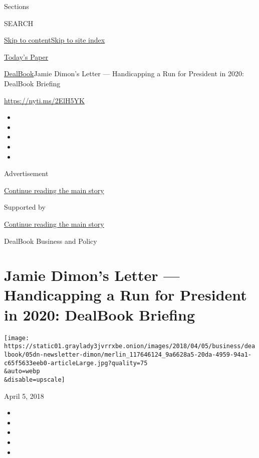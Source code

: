 Sections

SEARCH

\protect\hyperlink{site-content}{Skip to
content}\protect\hyperlink{site-index}{Skip to site index}

\href{https://myaccount.nytimes3xbfgragh.onion/auth/login?response_type=cookie\&client_id=vi}{}

\href{https://www.nytimes3xbfgragh.onion/section/todayspaper}{Today's
Paper}

\href{/section/business/dealbook}{DealBook}\textbar{}Jamie Dimon's
Letter --- Handicapping a Run for President in 2020: DealBook Briefing

\url{https://nyti.ms/2ElH5YK}

\begin{itemize}
\item
\item
\item
\item
\item
\end{itemize}

Advertisement

\protect\hyperlink{after-top}{Continue reading the main story}

Supported by

\protect\hyperlink{after-sponsor}{Continue reading the main story}

DealBook Business and Policy

\hypertarget{jamie-dimons-letter--handicapping-a-run-for-president-in-2020-dealbook-briefing}{%
\section{Jamie Dimon's Letter --- Handicapping a Run for President in
2020: DealBook
Briefing}\label{jamie-dimons-letter--handicapping-a-run-for-president-in-2020-dealbook-briefing}}

\texttt{[image: https://static01.graylady3jvrrxbe.onion/images/2018/04/05/business/dealbook/05dn-newsletter-dimon/merlin\_117646124\_9a6628a5-20da-4959-94a1-c65f5633eeb0-articleLarge.jpg?quality=75\\\&auto=webp\\\&disable=upscale]}

April 5, 2018

\begin{itemize}
\item
\item
\item
\item
\item
\end{itemize}

